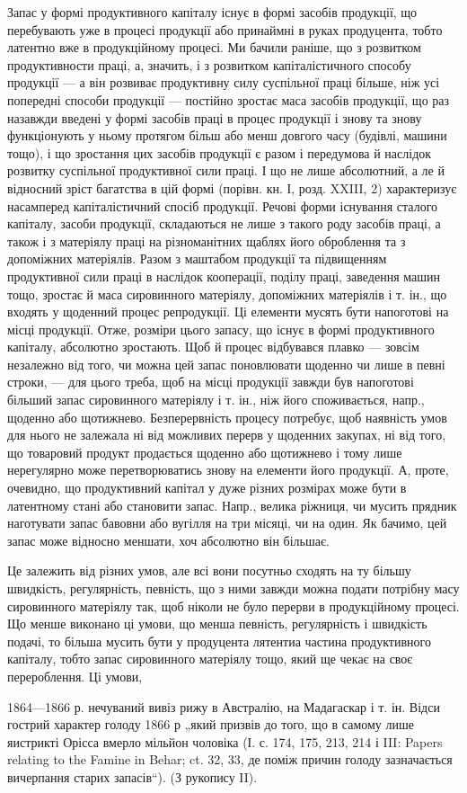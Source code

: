 Запас у формі продуктивного капіталу існує в формі засобів продукції,
що перебувають уже в процесі продукції або принаймні в руках
продуцента, тобто латентно вже в продукційному процесі. Ми бачили
раніше, що з розвитком продуктивности праці, а, значить, і з розвитком
капіталістичного способу продукції — а він розвиває продуктивну
силу суспільної праці більше, ніж усі попередні способи продукції —
постійно зростає маса засобів продукції, що раз назавжди введені
у формі засобів праці в процес продукції і знову та знову
функціонують у ньому протягом більш або менш довгого часу (будівлі,
машини тощо), і що зростання цих засобів продукції є разом і передумова
й наслідок розвитку суспільної продуктивної сили праці. І що не
лише абсолютний, а ле й відносний зріст багатства в цій формі (порівн.
кн. І, розд. XXIII, 2) характеризує насамперед капіталістичний спосіб
продукції. Речові форми існування сталого капіталу, засоби продукції,
складаються не лише з такого роду засобів праці, а також і з матеріялу
праці на різноманітних щаблях його оброблення та з допоміжних матеріялів.
Разом з маштабом продукції та підвищенням продуктивної сили
праці в наслідок кооперації, поділу праці, заведення машин тощо, зростає
й маса сировинного матеріялу, допоміжних матеріялів і т. ін., що
входять у щоденний процес репродукції. Ці елементи мусять бути напоготові
на місці продукції. Отже, розміри цього запасу, що існує в формі продуктивного
капіталу, абсолютно зростають. Щоб й процес відбувався плавко —
зовсім незалежно від того, чи можна цей запас поновлювати щоденно чи
лише в певні строки, — для цього треба, щоб на місці продукції завжди
був напоготові більший запас сировинного матеріялу і т. ін., ніж його
споживається, напр., щоденно або щотижнево. Безперервність процесу
потребує, щоб наявність умов для нього не залежала ні від можливих
перерв у щоденних закупах, ні від того, що товаровий продукт продається
щоденно або щотижнево і тому лише нерегулярно може перетворюватись
знову на елементи його продукції. А, проте, очевидно, що
продуктивний капітал у дуже різних розмірах може бути в латентному
стані або становити запас. Напр., велика ріжниця, чи мусить прядник
наготувати запас бавовни або вугілля на три місяці, чи на один. Як
бачимо, цей запас може відносно меншати, хоч абсолютно він більшає.

Це залежить від різних умов, але всі вони посутньо сходять на ту
більшу швидкість, регулярність, певність, що з ними завжди можна подати
потрібну масу сировинного матеріялу так, щоб ніколи не було перерви
в продукційному процесі. Що менше виконано ці умови, що менша
певність, регулярність і швидкість подачі, то більша мусить бути у продуцента
лятентиа частина продуктивного капіталу, тобто запас сировинного
матеріялу тощо, який ще чекає на своє перероблення. Ці умови,

1864—1866 р. нечуваний вивіз рижу в Австралію, на Мадагаскар і т. ін. Відси
гострий характер голоду 1866 р „який призвів до того, що в самому лише
яистрикті Орісса вмерло мільйон чоловіка (І. с. 174, 175, 213, 214 і III: Papers relating
to the Famine in Behar; ct. 32, 33, де поміж причин голоду зазначається вичерпання старих запасів“).
(З рукопису II).
\parbreak{}  %
